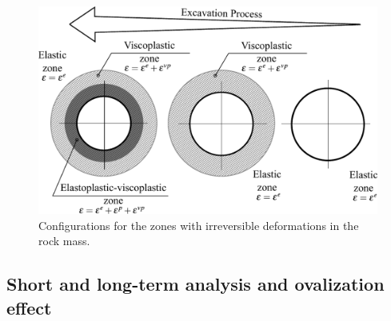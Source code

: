 \documentclass[a4paper,fleqn]{cas-sc}
\begin{document}
\begin{figure}[h!]
	\centering
	\includegraphics[scale=0.6]{zones.pdf}
	\caption{Configurations for the zones with irreversible deformations in the rock mass.}
	\label{zones}
\end{figure}

\subsection{Short and long-term analysis and ovalization effect}\label{}
\end{document}
